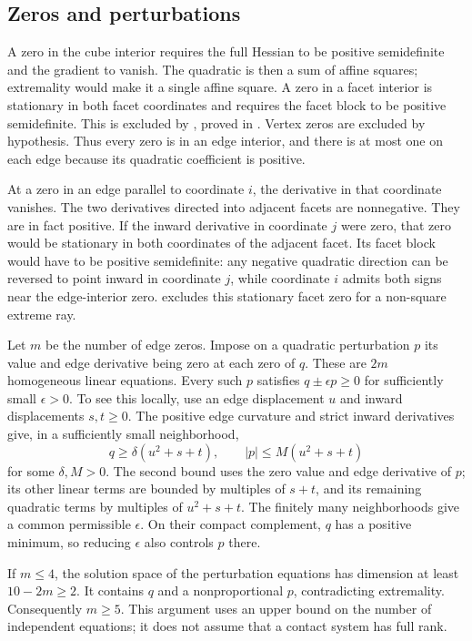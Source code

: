 \subsection{Zeros and perturbations}

A zero in the cube interior requires the full Hessian to be positive
semidefinite and the gradient to vanish. The quadratic is then a sum of
affine squares; extremality would make it a single affine square. A zero
in a facet interior is stationary in both facet coordinates and requires
the facet block to be positive semidefinite. This is excluded by
, proved in
. Vertex zeros are excluded by
hypothesis. Thus every zero is in an edge interior, and there is at most
one on each edge because its quadratic coefficient is positive.

At a zero in an edge parallel to coordinate $i$, the derivative in that
coordinate vanishes. The two derivatives directed into adjacent facets
are nonnegative. They are in fact positive. If the inward derivative in
coordinate $j$ were zero, that zero would be stationary in both coordinates
of the adjacent facet. Its facet block would have to be positive
semidefinite: any negative quadratic direction can be reversed to point
inward in coordinate $j$, while coordinate $i$ admits both signs near the
edge-interior zero.  excludes this stationary
facet zero for a non-square extreme ray.

Let $m$ be the number of edge zeros. Impose on a quadratic perturbation
$p$ its value and edge derivative being zero at each zero of $q$. These
are $2m$ homogeneous linear equations. Every such $p$ satisfies
$q\pm\epsilon p\ge0$ for sufficiently small $\epsilon>0$. To see this
locally, use an edge displacement $u$ and inward displacements $s,t\ge0$.
The positive edge curvature and strict inward derivatives give, in a
sufficiently small neighborhood,
\[
 q\ge \delta(u^2+s+t),\qquad
 |p|\le M(u^2+s+t)
\]
for some $\delta,M>0$. The second bound uses the zero value and edge
derivative of $p$; its other linear terms are bounded by multiples of
$s+t$, and its remaining quadratic terms by multiples of $u^2+s+t$.
The finitely many neighborhoods give a common permissible $\epsilon$.
On their compact complement, $q$ has a positive minimum, so reducing
$\epsilon$ also controls $p$ there.

If $m\le4$, the solution space of the perturbation equations has dimension
at least $10-2m\ge2$. It contains $q$ and a nonproportional $p$, contradicting
extremality. Consequently $m\ge5$. This argument uses an upper bound on
the number of independent equations; it does not assume that a contact
system has full rank.

